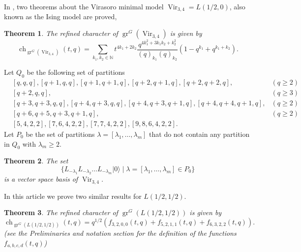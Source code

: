 \documentclass[12pt, a4paper]{article}
\newtheorem{theorem}{Theorem}
\DeclareMathOperator{\Vir}{Vir}
\DeclareMathOperator{\gr}{gr}
\DeclareMathOperator{\ch}{ch}
\newcommand{\vac}{|0\rangle}
\begin{document}
In \cite{andrews_singular_2022}, two theorems about the Virasoro minimal model $\Vir_{3, 4}=L(1/2, 0)$, also known as the Ising model are proved,

\begin{theorem}
  \label{thr:1}
  The refined character of $\gr^G(\Vir_{3,4})$ is given by
  \begin{equation*}
    \ch_{\gr^G(\Vir_{3, 4})}(t, q) = \sum_{k_1, k_2\in \mathbb{N}}t^{4k_1 + 2k_2}\frac{q^{4k_1^2 + 3k_1k_2 + k_2^2}}{(q)_{k_1}(q)_{k_2}}(1 - q^{k_1} + q^{k_1 + k_2}).
  \end{equation*}
\end{theorem}

Let $Q_0$ be the following set of partitions
\begin{align*}
  &[q, q, q], [q + 1, q, q], [q + 1, q + 1, q], [q + 2, q + 1, q], [q + 2, q + 2, q], &(q \ge 2) \\
  &[q + 2, q, q], &(q \ge 3) \\
  &[q + 3, q + 3, q, q], [q + 4, q + 3, q, q],  [q + 4, q + 3, q + 1, q], [q + 4, q + 4, q + 1, q], &(q \ge 2) \\
  &[q + 6, q + 5, q + 3, q + 1, q], &(q \ge 2) \\
  &[5, 4, 2, 2], [7, 6, 4, 2, 2], [7, 7, 4, 2, 2], [9, 8, 6, 4, 2, 2].
\end{align*}
Let $P_0$ be the set of partitions $\lambda = [\lambda_1, \dots, \lambda_m]$ that do not contain any partition in $Q_0$ with $\lambda_m \ge 2$.

\begin{theorem}
  \label{thr:2}
  The set
  \begin{equation*}
    \{L_{-\lambda_1}L_{-\lambda_2}\dots L_{-\lambda_m}\vac \mid \lambda = [\lambda_1, \dots, \lambda_m] \in P_0\}
  \end{equation*}
  is a vector space basis of $\Vir_{3, 4}$.
\end{theorem}

In this article we prove two similar results for $L(1/2,1/2)$.

\begin{theorem}
  \label{thr:3}
  The refined character of $\gr^G(L(1/2, 1/2))$ is given by
  \begin{equation*}
    \ch_{\gr^G(L(1/2, 1/2))}(t, q) = q^{1/2}(f_{3, 2, 0, 0}(t, q) + f_{5, 2, 1, 1}(t, q) + f_{6, 3, 2, 2}(t, q)).
  \end{equation*}
  (see the Preliminaries and notation section for the definition of the functions $f_{a, b, c, d}(t, q)$)
\end{theorem}
\end{document}
